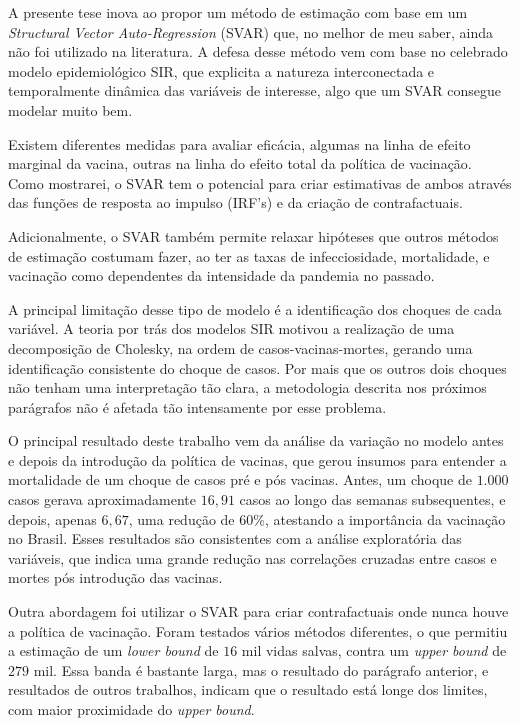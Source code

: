 \documentclass[
    article,
	12pt,				%
	oneside,			%
	a4paper,			%
	english,			%
	brazil,				%
	hyperref = {colorlinks, citecolor=c1d, linkcolor=c2d, urlcolor=c3d, colorlinks}
	]{abntex2}
\begin{document}
A presente tese inova ao propor um método de estimação com base em um \textit{Structural Vector Auto-Regression} (SVAR) que, no melhor de meu saber, ainda não foi utilizado na literatura. A defesa desse método vem com base no celebrado modelo epidemiológico SIR, que explicita a natureza interconectada e temporalmente dinâmica das variáveis de interesse, algo que um SVAR consegue modelar muito bem.

Existem diferentes medidas para avaliar eficácia, algumas na linha de efeito marginal da vacina, outras na linha do efeito total da política de vacinação. Como mostrarei, o SVAR tem o potencial para criar estimativas de ambos através das funções de resposta ao impulso (IRF's) e da criação de contrafactuais. 

Adicionalmente, o SVAR também permite relaxar hipóteses que outros métodos de estimação costumam fazer, ao ter as taxas de infecciosidade, mortalidade, e vacinação como dependentes da intensidade da pandemia no passado.

A principal limitação desse tipo de modelo é a identificação dos choques de cada variável. A teoria por trás dos modelos SIR motivou a realização de uma decomposição de Cholesky, na ordem de casos-vacinas-mortes, gerando uma identificação consistente do choque de casos. Por mais que os outros dois choques não tenham uma interpretação tão clara, a metodologia descrita nos próximos parágrafos não é afetada tão intensamente por esse problema.

O principal resultado deste trabalho vem da análise da variação no modelo antes e depois da introdução da política de vacinas, que gerou insumos para entender a mortalidade de um choque de casos pré e pós vacinas. Antes, um choque de $1.000$ casos gerava aproximadamente $16,91$ casos ao longo das semanas subsequentes, e depois, apenas $6,67$, uma redução de $60$\%, atestando a importância da vacinação no Brasil. Esses resultados são consistentes com a análise exploratória das variáveis, que indica uma grande redução nas correlações cruzadas entre casos e mortes pós introdução das vacinas.

Outra abordagem foi utilizar o SVAR para criar contrafactuais onde nunca houve a política de vacinação. Foram testados vários métodos diferentes, o que permitiu a estimação de um \textit{lower bound} de $16$ mil vidas salvas, contra um \textit{upper bound} de $279$ mil. Essa banda é bastante larga, mas o resultado do parágrafo anterior, e resultados de outros trabalhos, indicam que o resultado está longe dos limites, com maior proximidade do \textit{upper bound}.
\end{document}
